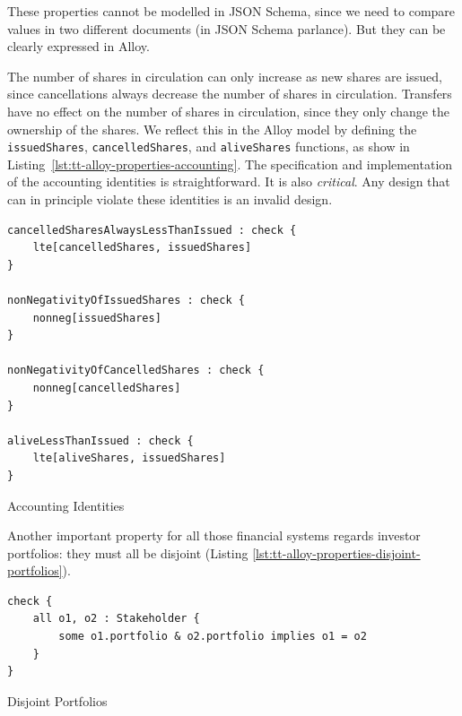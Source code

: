%

{These properties cannot be modelled in JSON Schema, since we need to compare values in two different documents (in JSON Schema parlance).} But they can be clearly expressed in Alloy.

The number of shares in circulation can only increase as new shares are issued, since cancellations always decrease the number of shares in circulation. Transfers have no effect on the number of shares in circulation, since they only change the ownership of the shares. We reflect this in the Alloy model by defining the \verb|issuedShares|, \verb|cancelledShares|, and \verb|aliveShares| functions, as show in Listing~\ref{lst:tt-alloy-properties-accounting}. The specification and implementation of the accounting identities is straightforward. It is also \textit{critical}. Any design that can in principle violate these identities is an invalid design.

\begin{listing}[!h]
\begin{verbatim}
cancelledSharesAlwaysLessThanIssued : check {
    lte[cancelledShares, issuedShares]
}

nonNegativityOfIssuedShares : check {
    nonneg[issuedShares]
}

nonNegativityOfCancelledShares : check {
    nonneg[cancelledShares]
}

aliveLessThanIssued : check {
    lte[aliveShares, issuedShares]
}
\end{verbatim}
\caption{Accounting Identities}\label{lst:tt-alloy-properties-accounting}
\end{listing}

Another important property for all those financial systems regards investor portfolios: they must all be disjoint (Listing \ref{lst:tt-alloy-properties-disjoint-portfolios}).

\begin{listing}[!h]
	\begin{verbatim}
check {
    all o1, o2 : Stakeholder {
        some o1.portfolio & o2.portfolio implies o1 = o2
    }
}
\end{verbatim}
	\caption{Disjoint Portfolios}
\label{lst:tt-alloy-properties-disjoint-portfolios}
\end{listing}

